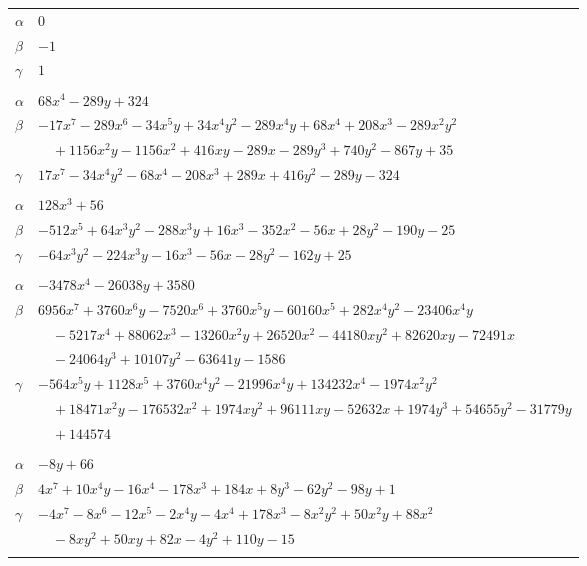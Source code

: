 \documentclass[11pt]{article}
\begin{document}
\begin{longtable}{@{}ll@{}}
$\alpha$ & $0$\\
$\beta$ & $-1$\\
$\gamma$ & $1$\\
\addlinespace[3pt]
\multicolumn{2}{@{}l}{$\{i,j\}=\{17,7\}$, $k_{ij}=2^{2}\cdot 3^{4}$}\\
$\alpha$ & $68x^{4}-289y+324$\\
$\beta$ & $-17x^{7}-289x^{6}-34x^{5}y+34x^{4}y^{2}-289x^{4}y+68x^{4}+208x^{3}-289x^{2}y^{2}$\\
 & $\quad +1156x^{2}y-1156x^{2}+416xy-289x-289y^{3}+740y^{2}-867y+35$\\
$\gamma$ & $17x^{7}-34x^{4}y^{2}-68x^{4}-208x^{3}+289x+416y^{2}-289y-324$\\
\addlinespace[3pt]
\multicolumn{2}{@{}l}{$\{i,j\}=\{17,18\}$, $k_{ij}=3^{4}$}\\
$\alpha$ & $128x^{3}+56$\\
$\beta$ & $-512x^{5}+64x^{3}y^{2}-288x^{3}y+16x^{3}-352x^{2}-56x+28y^{2}-190y-25$\\
$\gamma$ & $-64x^{3}y^{2}-224x^{3}y-16x^{3}-56x-28y^{2}-162y+25$\\
\addlinespace[3pt]
\multicolumn{2}{@{}l}{$\{i,j\}=\{6,7\}$, $k_{ij}=2^{3}\cdot 3\cdot 17$}\\
$\alpha$ & $-3478x^{4}-26038y+3580$\\
$\beta$ & $6956x^{7}+3760x^{6}y-7520x^{6}+3760x^{5}y-60160x^{5}+282x^{4}y^{2}-23406x^{4}y$\\
 & $\quad -5217x^{4}+88062x^{3}-13260x^{2}y+26520x^{2}-44180xy^{2}+82620xy-72491x$\\
 & $\quad -24064y^{3}+10107y^{2}-63641y-1586$\\
$\gamma$ & $-564x^{5}y+1128x^{5}+3760x^{4}y^{2}-21996x^{4}y+134232x^{4}-1974x^{2}y^{2}$\\
 & $\quad +18471x^{2}y-176532x^{2}+1974xy^{2}+96111xy-52632x+1974y^{3}+54655y^{2}-31779y$\\
 & $\quad +144574$\\
\addlinespace[3pt]
\multicolumn{2}{@{}l}{$\{i,j\}=\{7,24\}$, $k_{ij}=3^{4}$}\\
$\alpha$ & $-8y+66$\\
$\beta$ & $4x^{7}+10x^{4}y-16x^{4}-178x^{3}+184x+8y^{3}-62y^{2}-98y+1$\\
$\gamma$ & $-4x^{7}-8x^{6}-12x^{5}-2x^{4}y-4x^{4}+178x^{3}-8x^{2}y^{2}+50x^{2}y+88x^{2}$\\
 & $\quad -8xy^{2}+50xy+82x-4y^{2}+110y-15$\\
\addlinespace[3pt]
\multicolumn{2}{@{}l}{$\{i,j\}=\{15,5\}$, $k_{ij}=1$}\\

\end{longtable}
\end{document}
